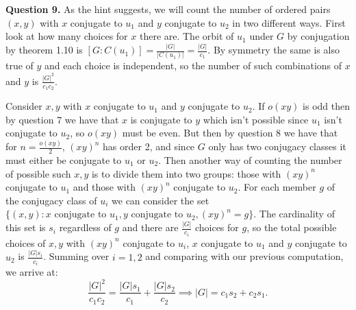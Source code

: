 \documentclass[letterpaper, reqno,11pt]{article}
\begin{document}
{\medskip\noindent\bf Question 9.} As the hint suggests, we will count the number of ordered pairs $(x,y)$ with $x$ conjugate to $u_1$ and $y$ conjugate to $u_2$ in two different ways. First look at how many choices for $x$ there are. The orbit of $u_1$ under $G$ by conjugation by theorem 1.10 is $[G:C(u_1)]=\frac{|G|}{|C(u_1)|}=\frac{|G|}{c_1}$. By symmetry the same is also true of $y$ and each choice is independent, so the number of such combinations of $x$ and $y$ is $\frac{|G|^2}{c_1c_2}$.

Consider $x,y$ with $x$ conjugate to $u_1$ and $y$ conjugate to $u_2$. If $o(xy)$ is odd then by question 7 we have that $x$ is conjugate to $y$ which isn't possible since $u_1$ isn't conjugate to $u_2$, so $o(xy)$ must be even. But then by question 8 we have that for $n=\frac{o(xy)}{2}$, $(xy)^{n}$ has order 2, and since $G$ only has two conjugacy classes it must either be conjugate to $u_1$ or $u_2$. Then another way of counting the number of possible such $x,y$ is to divide them into two groups: those with $(xy)^{n}$ conjugate to $u_1$ and those with $(xy)^{n}$ conjugate to $u_2$. For each member $g$ of the conjugacy class of $u_i$ we can consider the set $\{(x,y): x\text{ conjugate to }u_1,y\text{ conjugate to }u_2,(xy)^{n}=g\}$. The cardinality of this set is $s_i$ regardless of $g$ and there are $\frac{|G|}{c_i}$ choices for $g$, so the total possible choices of $x,y$ with $(xy)^{n}$ conjugate to $u_i$, $x$ conjugate to $u_1$ and $y$ conjugate to $u_2$ is $\frac{|G|s_i}{c_i}$. Summing over $i=1,2$ and comparing with our previous computation, we arrive at:
\[
\frac{|G|^2}{c_1c_2}=\frac{|G|s_1}{c_1}+\frac{|G|s_2}{c_2}\implies |G|=c_1s_2+c_2s_1
.\]
\end{document}
